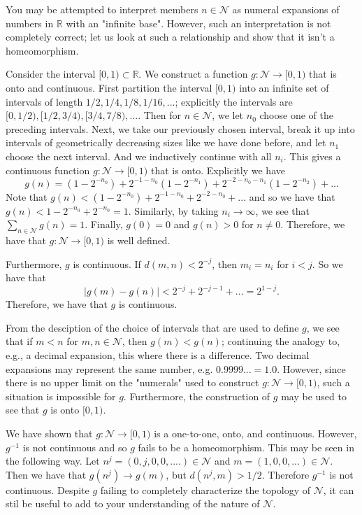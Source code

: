 You may be attempted to interpret members \(n \in \mathcal N\) as numeral expansions of numbers in \(\mathbb R\)
with an "infinite base". However, such an interpretation is not completely correct; let us look at such a
relationship and show that it isn't a homeomorphism.

Consider the interval \([0, 1) \subset \mathbb R\). We construct a function
\(g: \mathcal N \to [0, 1)\) that is onto and continuous. First partition the interval \([0, 1)\) into an
infinite set of intervals of length \(1/2, 1/4, 1/8, 1/16, ...\); explicitly the intervals are
\([0, 1/2), [1/2, 3/4), [3/4, 7/8), ...\). Then for \(n \in \mathcal N\), we let \(n_0\) choose one of the
preceding intervals. Next, we take our previously chosen interval, break it up into intervals of geometrically
decreasing sizes like we have done before, and let \(n_1\) choose the next interval. And we inductively
continue with all \(n_i\). This gives a continuous function \(g: \mathcal N \to [0, 1)\) that is onto.
Explicitly we have
\begin{equation}
g(n) = (1 - 2^{-n_0}) + 2^{-1 - n_0}(1 - 2^{-n_1}) + 2^{-2 - n_0 - n_1}(1 - 2^{-n_2}) + ... 
\end{equation} 
Note that \(g(n) < (1 - 2^{-n_0}) + 2^{-1-n_0} + 2^{-2-n_0} + ...\) and so we have that
\(g(n) < 1 - 2^{-n_0} + 2^{-n_0} = 1\). Similarly, by taking \(n_i \to \infty\), we see that
\(\sum_{n\in\mathcal N} g(n) = 1\). Finally, \(g(0) = 0\) and \(g(n) > 0\) for \(n \neq 0\).
Therefore, we have that
\(g: \mathcal N  \to [0, 1)\) is well defined.

Furthermore, \(g\) is continuous. If \(d(m, n) < 2^{-j}\), then \(m_i = n_i\) for \(i < j\). So we have that 
\begin{equation}
|g(m) - g(n)| < 2^{-j} + 2^{-j-1} + ... = 2^{1-j}.
\end{equation}
Therefore, we have that \(g\) is continuous.

From the desciption of the choice of intervals that are used to define \(g\), we see that if \(m < n\) for
\(m, n \in \mathcal N\), then \(g(m) < g(n)\); continuing the analogy to, e.g., a decimal expansion, this where
there is a difference. Two decimal expansions may represent the same number, e.g. \( 0.9999... = 1.0\).
However, since there is no upper limit on the "numerals" used to construct \(g : \mathcal N \to [0, 1)\), such
a situation is impossible for \(g\). Furthermore, the construction of \(g\) may be used to see that \(g\)
is onto \([0, 1)\).

We have shown that \(g: \mathcal N \to [0, 1)\) is a one-to-one, onto, and continuous. However, \(g^{-1}\) is
not continuous and so \(g\) fails to be a homeomorphism. This may be seen in the following way. Let
\(n^j = (0, j, 0, 0, ....) \in \mathcal N\) and \(m = (1, 0, 0, ...) \in \mathcal N\). Then we have that
\(g(n^j) \to g(m)\), but \(d(n^j, m) > 1/2\). Therefore \(g^{-1}\) is not continuous. Despite \(g\)
failing to completely characterize the topology of \(\mathcal N\), it can stil be useful to add to your 
understanding of the nature of \(\mathcal N\). 

